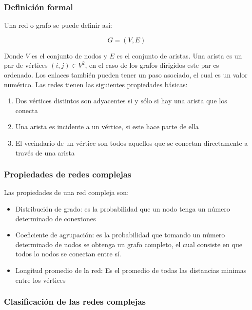\subsubsection{Definición formal}

Una red o grafo se puede definir así:

\begin{equation}
    G = (V,E)
\end{equation}

Donde $V$ es el conjunto de nodos y $E$ es el conjunto de aristas. Una arista es un par de vértices $(i,j)\in V^2$, en el caso de los grafos dirigidos este par es ordenado. Los enlaces también pueden tener un paso asociado, el cual es un valor numérico. Las redes tienen las siguientes propiedades básicas:

\begin{enumerate}
    \item Dos vértices distintos son adyacentes si y sólo si hay una arista que los conecta
    \item Una arista es incidente a un vértice, si este hace parte de ella
    \item El vecindario de un vértice son todos aquellos que se conectan directamente a través de una arista
\end{enumerate}

\subsubsection{Propiedades de redes complejas}

Las propiedades de una red compleja son\cite{barabasi2002linked}:

\begin{itemize}
    \item Distribución de grado: es la probabilidad que un nodo tenga un número determinado de conexiones
    \item Coeficiente de agrupación: es la probabilidad que tomando un número determinado de nodos se obtenga un grafo completo, el cual consiste en que todos lo nodos se conectan entre sí.
    \item Longitud promedio de la red: Es el promedio de todas las distancias minimas entre los vértices
\end{itemize}

\subsubsection{Clasificación de las redes complejas}

